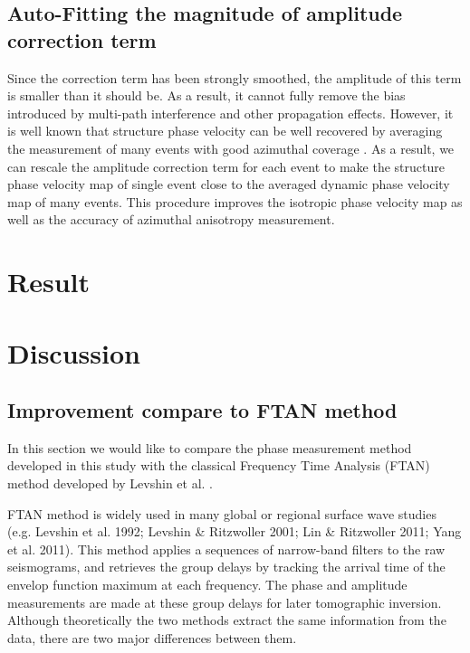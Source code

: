 \documentclass[referee]{gji}
\begin{document}
\subsection{Auto-Fitting the magnitude of amplitude correction term}

Since the correction term has been strongly smoothed, the amplitude of this term is smaller than it should be. As a result, it cannot fully remove the bias introduced by multi-path interference and other propagation effects. However, it is well known that structure phase velocity can be well recovered by averaging the measurement of many events with good azimuthal coverage \cite{Bodin:2008jk}. As a result, we can rescale the amplitude correction term for each event to make the structure phase velocity map of single event close to the averaged dynamic phase velocity map of many events. This procedure improves the isotropic phase velocity map as well as the accuracy of azimuthal anisotropy measurement.


\section{Result}

\section{Discussion}

\subsection{Improvement compare to FTAN method}

In this section we would like to compare the phase measurement method developed in this study with the classical Frequency Time Analysis (FTAN) method developed by Levshin et al. . 

FTAN method is widely used in many global or regional surface wave studies (e.g. Levshin et al. 1992; Levshin \& Ritzwoller 2001; Lin \& Ritzwoller 2011; Yang et al. 2011). This method applies a sequences of narrow-band filters to the raw seismograms, and retrieves the group delays by tracking the arrival time of the envelop function maximum at each frequency. The phase and amplitude measurements are made at these group delays for later tomographic inversion. Although theoretically the two methods extract the same information from the data, there are two major differences between them. 
\end{document}
